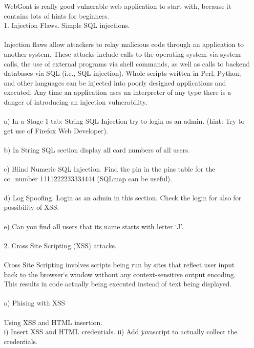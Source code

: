 \documentclass[12pt, a4paper]{article}
\begin{document}
WebGoat is really good vulnerable web application to start with, because it contains lots of hints for beginners.\\

1. Injection Flaws. Simple SQL injections.\\
\\
Injection flaws allow attackers to relay malicious code through an application to another system. These attacks include calls to the operating system via system calls, the use of external programs via shell commands, as well as calls to backend databases via SQL (i.e., SQL injection). Whole scripts written in Perl, Python, and other languages can be injected into poorly designed applications and executed. Any time an application uses an interpreter of any type there is a danger of introducing an injection vulnerability.\\
\\
a) In a Stage 1 tab: String SQL Injection try to login as an admin. (hint: Try to get use of Firefox Web Developer).\\
\\
b) In String SQL section display all card numbers of all users.\\
\\
c) Blind Numeric SQL Injection. Find the pin in the pins table for the cc\_number 1111222233334444 (SQLmap can be useful).\\
\\
d) Log Spoofing. Login as an admin in this section. Check the login for also for possibility of XSS.\\
\\
e) Can you find all users	that its name starts with letter ‘J’.\\
\\
2. Cross Site Scripting (XSS) attacks.\\
\\
Cross Site Scripting involves scripts being run by sites that reflect user input back to the browser‘s window without any context-sensitive output encoding. This results in code actually being executed instead of text being displayed.\\
\\
a) Phising with XSS\\
\\
Using XSS and HTML insertion.\\
i) Insert XSS and HTML credentials.
ii) Add javascript to actually collect the credentials.\\
\\
\end{document}
